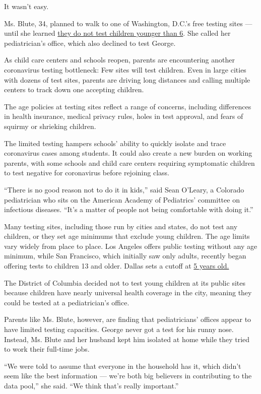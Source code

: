 It wasn't easy.

Ms. Blute, 34, planned to walk to one of Washington, D.C.'s free testing
sites --- until she learned
\href{https://coronavirus.dc.gov/testing}{they do not test children
younger than 6}. She called her pediatrician's office, which also
declined to test George.

As child care centers and schools reopen, parents are encountering
another coronavirus testing bottleneck: Few sites will test children.
Even in large cities with dozens of test sites, parents are driving long
distances and calling multiple centers to track down one accepting
children.

The age policies at testing sites reflect a range of concerns, including
differences in health insurance, medical privacy rules, holes in test
approval, and fears of squirmy or shrieking children.

The limited testing hampers schools' ability to quickly isolate and
trace coronavirus cases among students. It could also create a new
burden on working parents, with some schools and child care centers
requiring symptomatic children to test negative for coronavirus before
rejoining class.

``There is no good reason not to do it in kids,'' said Sean O'Leary, a
Colorado pediatrician who sits on the American Academy of Pediatrics'
committee on infectious diseases. ``It's a matter of people not being
comfortable with doing it.''

Many testing sites, including those run by cities and states, do not
test any children, or they set age minimums that exclude young children.
The age limits vary widely from place to place. Los Angeles offers
public testing without any age minimum, while San Francisco, which
initially saw only adults, recently began offering tests to children 13
and older. Dallas sets a cutoff at
\href{https://www.dallascounty.org/covid-19/testing-locations.php}{5
years old.}

The District of Columbia decided not to test young children at its
public sites because children have nearly universal health coverage in
the city, meaning they could be tested at a pediatrician's office.

Parents like Ms. Blute, however, are finding that pediatricians' offices
appear to have limited testing capacities. George never got a test for
his runny nose. Instead, Ms. Blute and her husband kept him isolated at
home while they tried to work their full-time jobs.

``We were told to assume that everyone in the household has it, which
didn't seem like the best information --- we're both big believers in
contributing to the data pool,'' she said. ``We think that's really
important.''

